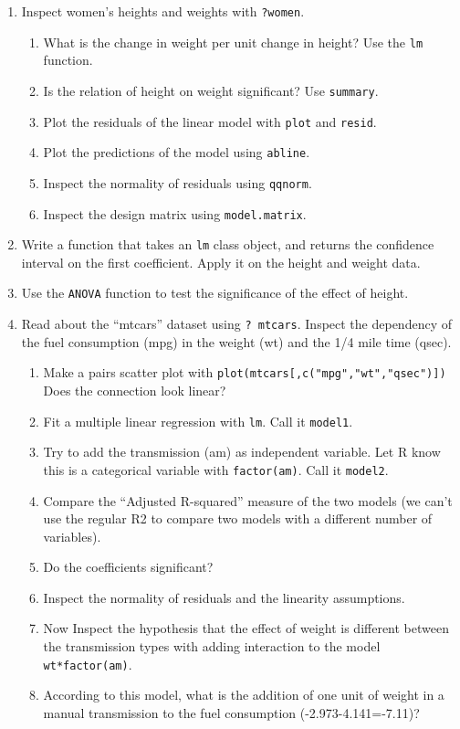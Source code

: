 \documentclass[]{book}
\providecommand{\tightlist}{%
  \setlength{\itemsep}{0pt}\setlength{\parskip}{0pt}}
\theoremstyle{definition}
\theoremstyle{definition}
\theoremstyle{definition}
\theoremstyle{remark}
\begin{document}
\begin{enumerate}
\def\labelenumi{\arabic{enumi}.}
\item
  Inspect women's heights and weights with \texttt{?women}.

  \begin{enumerate}
  \def\labelenumii{\arabic{enumii}.}
  \tightlist
  \item
    What is the change in weight per unit change in height? Use the
    \texttt{lm} function.
  \item
    Is the relation of height on weight significant? Use
    \texttt{summary}.
  \item
    Plot the residuals of the linear model with \texttt{plot} and
    \texttt{resid}.
  \item
    Plot the predictions of the model using \texttt{abline}.
  \item
    Inspect the normality of residuals using \texttt{qqnorm}.
  \item
    Inspect the design matrix using \texttt{model.matrix}.
  \end{enumerate}
\item
  Write a function that takes an \texttt{lm} class object, and returns
  the confidence interval on the first coefficient. Apply it on the
  height and weight data.
\item
  Use the \texttt{ANOVA} function to test the significance of the effect
  of height.
\item
  Read about the ``mtcars'' dataset using \texttt{?\ mtcars}. Inspect
  the dependency of the fuel consumption (mpg) in the weight (wt) and
  the 1/4 mile time (qsec).

  \begin{enumerate}
  \def\labelenumii{\arabic{enumii}.}
  \tightlist
  \item
    Make a pairs scatter plot with
    \texttt{plot(mtcars{[},c("mpg","wt","qsec"){]})} Does the connection
    look linear?
  \item
    Fit a multiple linear regression with \texttt{lm}. Call it
    \texttt{model1}.
  \item
    Try to add the transmission (am) as independent variable. Let R know
    this is a categorical variable with \texttt{factor(am)}. Call it
    \texttt{model2}.
  \item
    Compare the ``Adjusted R-squared'' measure of the two models (we
    can't use the regular R2 to compare two models with a different
    number of variables).
  \item
    Do the coefficients significant?
  \item
    Inspect the normality of residuals and the linearity assumptions.
  \item
    Now Inspect the hypothesis that the effect of weight is different
    between the transmission types with adding interaction to the model
    \texttt{wt*factor(am)}.
  \item
    According to this model, what is the addition of one unit of weight
    in a manual transmission to the fuel consumption
    (-2.973-4.141=-7.11)?
  \end{enumerate}
\end{enumerate}
\end{document}
